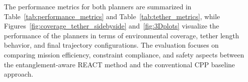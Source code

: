 





The performance metrics for both planners are summarized in Table~\ref{tab:performance_metrics} and Table~\ref{tab:tether_metrics}, while Figures~\ref{fig:coverage_tether_sidebyside} and~\ref{fig:3Dplots} visualize the performance of the planners in terms of environmental coverage, tether length behavior, and final trajectory configurations. The evaluation focuses on comparing mission efficiency, constraint compliance, and safety aspects between the entanglement-aware \ac{REACT} method and the conventional \ac{CPP} baseline approach.




